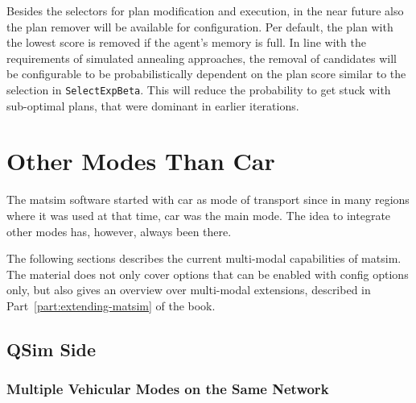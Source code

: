 Besides the selectors for plan modification and execution, in the near future also the plan remover will be available for configuration. Per default, the plan with the lowest score is removed if the agent's memory is full. In line with the requirements of \eg simulated annealing approaches, the removal of candidates will be configurable to be probabilistically dependent on the plan score similar to the selection in \lstinline|SelectExpBeta|. This will reduce the probability to get stuck with sub-optimal plans, that were dominant in earlier iterations.

\section{Other Modes Than Car}
\label{sec:using-othermodesthancar}

 



The \gls{matsim} software started with car as mode of transport since in many regions where it was used at that time, car was the main mode.  The idea to integrate other modes has, however, always been there.

The following sections describes the current multi-modal capabilities of \gls{matsim}.  The material does not only cover options that can be enabled with config options only, but also gives an overview over multi-modal extensions, described in Part~\ref{part:extending-matsim} of the book.

\subsection{QSim Side}
\label{sec:using-qsim-multimodal}
\subsubsection{Multiple Vehicular Modes on the Same Network}

